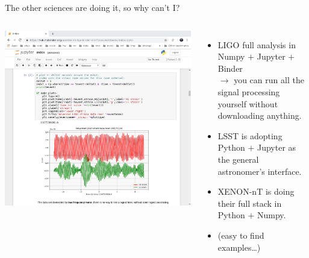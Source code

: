 \documentclass[aspectratio=169]{beamer}
\begin{document}
\begin{frame}{The other sciences are doing it, so why can't I?}
\vspace{0.3 cm}
\begin{columns}[b]
\includegraphics[width=\linewidth]{lsst-notebook.png}

\begin{itemize}\setlength{\itemsep}{0.5 cm}
\item LIGO full analysis in \\ Numpy $+$ Jupyter $+$ Binder \\ $\to$ you can run all the signal processing yourself without downloading anything.
\item LSST is adopting Python $+$ Jupyter as the general astronomer's interface.
\item XENON-nT is doing their full stack in Python $+$ Numpy.
\item (easy to find examples\ldots)
\end{itemize}

\vspace{0.75 cm}
\end{columns}
\end{frame}
\end{document}
